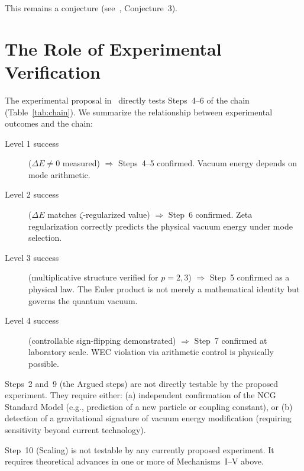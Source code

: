 \documentclass[aps,prd,twocolumn,superscriptaddress,nofootinbib]{revtex4-2}
\begin{document}
This remains a conjecture (see~\cite{paper_B}, Conjecture~3).

\section{The Role of Experimental Verification}
\label{sec:experiment}

The experimental proposal in~\cite{paper_A} directly tests
Steps~4--6 of the chain (Table~\ref{tab:chain}).
We summarize the relationship between experimental outcomes
and the chain:

\begin{description}
  \item[Level 1 success] ($\Delta E \neq 0$ measured)
    $\Rightarrow$ Steps~4--5 confirmed.
    Vacuum energy depends on mode arithmetic.

  \item[Level 2 success] ($\Delta E$ matches $\zeta$-regularized value)
    $\Rightarrow$ Step~6 confirmed.
    Zeta regularization correctly predicts the physical vacuum energy
    under mode selection.

  \item[Level 3 success] (multiplicative structure verified for $p=2,3$)
    $\Rightarrow$ Step~5 confirmed as a physical law.
    The Euler product is not merely a mathematical identity but
    governs the quantum vacuum.

  \item[Level 4 success] (controllable sign-flipping demonstrated)
    $\Rightarrow$ Step~7 confirmed at laboratory scale.
    WEC violation via arithmetic control is physically possible.
\end{description}

Steps~2 and~9 (the Argued steps) are not directly testable by
the proposed experiment. They require either:
(a) independent confirmation of the NCG Standard Model
(e.g., prediction of a new particle or coupling constant), or
(b) detection of a gravitational signature of vacuum energy
modification (requiring sensitivity beyond current technology).

Step~10 (Scaling) is not testable by any currently proposed
experiment. It requires theoretical advances in one or more of
Mechanisms~I--V above.

\end{document}
